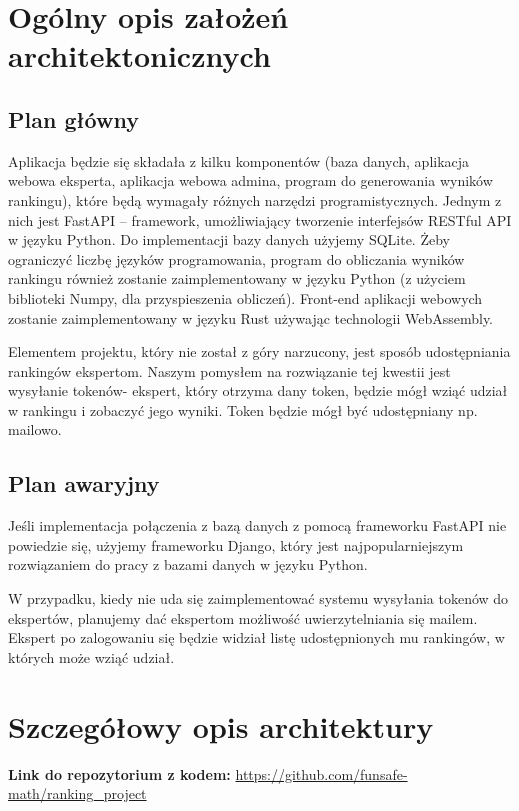 \documentclass{article}
\begin{document}
\section{Ogólny opis założeń architektonicznych}

\subsection{Plan główny}

Aplikacja będzie się składała z kilku komponentów (baza danych,
aplikacja webowa eksperta, aplikacja webowa admina, program do
generowania wyników rankingu), które będą wymagały różnych narzędzi
programistycznych. Jednym z nich jest FastAPI -- framework, umożliwiający
tworzenie interfejsów RESTful API w języku Python. Do implementacji bazy
danych użyjemy SQLite. Żeby ograniczyć liczbę
języków programowania, program do obliczania wyników rankingu również
zostanie zaimplementowany w języku Python (z użyciem biblioteki Numpy,
dla przyspieszenia obliczeń). Front-end aplikacji webowych zostanie
zaimplementowany w języku Rust używając technologii WebAssembly.

Elementem projektu, który nie został z góry narzucony, jest sposób
udostępniania rankingów ekspertom. Naszym pomysłem na rozwiązanie tej
kwestii jest wysyłanie tokenów- ekspert, który otrzyma dany token,
będzie mógł wziąć udział w rankingu i zobaczyć jego wyniki. Token będzie
mógł być udostępniany np. mailowo.

\subsection{Plan awaryjny}

Jeśli implementacja połączenia z bazą danych z pomocą frameworku FastAPI nie
powiedzie się, użyjemy frameworku Django, który
jest najpopularniejszym rozwiązaniem do pracy z bazami danych w języku
Python.

W przypadku, kiedy nie uda się zaimplementować systemu wysyłania tokenów
do ekspertów, planujemy dać ekspertom możliwość uwierzytelniania się
mailem. Ekspert po zalogowaniu się będzie widział listę udostępnionych
mu rankingów, w których może wziąć udział.

\section{Szczegółowy opis architektury}

\textbf{Link do repozytorium z kodem: }
\url{https://github.com/funsafe-math/ranking\_project}
\end{document}
